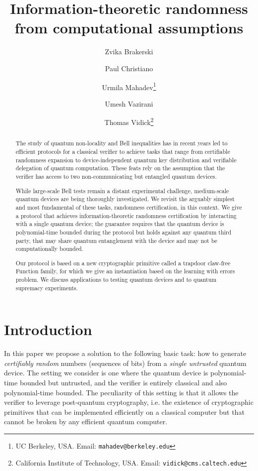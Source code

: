 \documentclass[11pt]{article}
\theoremstyle{remark}
\theoremstyle{definition}
\begin{document}
\title{Information-theoretic randomness from computational assumptions}
\author{Zvika Brakerski \and Paul Christiano \and Urmila Mahadev\thanks{UC Berkeley, USA. Email: \texttt{mahadev@berkeley.edu}} \and Umesh Vazirani \and Thomas Vidick\thanks{California Institute of Technology, USA. Email: \texttt{vidick@cms.caltech.edu}}}
\date{}
\maketitle

\noteswarning

\begin{abstract}
The study of quantum non-locality and Bell inequalities has in recent years led to efficient protocols for a classical verifier to achieve tasks that range from certifiable randomness expansion to device-independent quantum key distribution and verifiable delegation of quantum computation. These feats rely on the assumption that the verifier has access to two non-communicating but entangled quantum devices. 

While large-scale Bell tests remain a distant experimental challenge, medium-scale quantum devices are being thoroughly investigated. We revisit the arguably simplest and most fundamental of these tasks, randomness certification, in this context. We give a protocol that achieves information-theoretic randomness certification by interacting with a single quantum device; the guarantee requires that the quantum device is polynomial-time bounded during the protocol but holds against any quantum third party, that may share quantum entanglement with the device and may not be computationally bounded. 

Our protocol is based on a new cryptographic primitive called a trapdoor claw-free Function family, for which we give an instantiation based on the learning with errors problem. We discuss applications to testing quantum devices and to quantum supremacy experiments. 
\end{abstract}

\section{Introduction}

In this paper we propose a solution to the following basic task: how to generate \emph{certifiably random} numbers (sequences of bits) from a \emph{single untrusted} quantum device. The setting we consider is one where the quantum device is polynomial-time bounded but untrusted, and the verifier is entirely classical and also polynomial-time bounded. The peculiarity of this setting is that it allows the verifier to leverage post-quantum cryptography, i.e. the existence of cryptographic primitives that can be implemented efficiently on a classical computer but that cannot be broken by any efficient quantum computer. 
\end{document}
